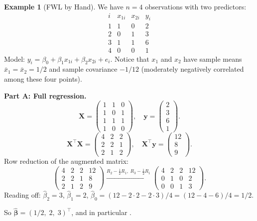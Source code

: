\documentclass[11pt,a4paper]{article}
\theoremstyle{plain}
\theoremstyle{definition}
\newtheorem{example}[theorem]{Example}
\newcommand{\bhat}{\hat{\bm{\beta}}}
\newcommand{\bX}{\bm{X}}
\newcommand{\by}{\bm{y}}
\begin{document}
\begin{example}[FWL by Hand]\label{ex:fwl}
We have $n=4$ observations with two predictors:
\[
\begin{array}{c|ccc}
i & x_{1i} & x_{2i} & y_i \\\hline
1 & 1 & 0 & 2 \\
2 & 0 & 1 & 3 \\
3 & 1 & 1 & 6 \\
4 & 0 & 0 & 1
\end{array}
\]
Model: $y_i = \beta_0 + \beta_1 x_{1i} + \beta_2 x_{2i} + e_i$.
Notice that $x_1$ and $x_2$ have sample means $\bar{x}_1 = \bar{x}_2 = 1/2$
and sample covariance $-1/12$ (moderately negatively correlated among these four points).

\medskip\noindent\textbf{Part A: Full regression.}
\[
\bX = \begin{pmatrix}1&1&0\\1&0&1\\1&1&1\\1&0&0\end{pmatrix},\quad
\by=\begin{pmatrix}2\\3\\6\\1\end{pmatrix}.
\]
\[
\bX^\top\bX = \begin{pmatrix}4&2&2\\2&2&1\\2&1&2\end{pmatrix},\quad
\bX^\top\by = \begin{pmatrix}12\\8\\9\end{pmatrix}.
\]
Row reduction of the augmented matrix:
\[
\left(\begin{array}{ccc|c}
4&2&2&12\\2&2&1&8\\2&1&2&9
\end{array}\right)
\xrightarrow{R_2-\frac{1}{2}R_1,\;R_3-\frac{1}{2}R_1}
\left(\begin{array}{ccc|c}
4&2&2&12\\0&1&0&2\\0&0&1&3
\end{array}\right).
\]
Reading off: $\hat\beta_2 = 3$, $\hat\beta_1 = 2$,
$\hat\beta_0 = (12-2\cdot 2-2\cdot 3)/4 = (12-4-6)/4 = 1/2$.

So $\bhat = (1/2,\; 2,\; 3)^\top$, and in particular .


\end{example}
\end{document}

